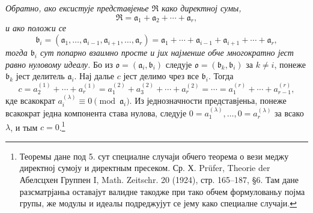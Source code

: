 \documentclass[11pt]{article}
\providecommand{\mR}{\mathfrak{R}}
\providecommand{\ma}{\mathfrak{a}}
\providecommand{\mb}{\mathfrak{b}}
\providecommand{\mo}{\mathfrak{o}}
\begin{document}
\emph{Обратно, ако ексистује представјенье $\mR$ како директној сумы,
\[
\mR=\ma_1+\ma_2+\cdots+\ma_r,
\]
и ако положи се
\[
\mb_i=(\ma_1,\ldots,\ma_{i-1},\ma_{i+1},\ldots,\ma_r)
=\ma_1+\cdots+\ma_{i-1}+\ma_{i+1}+\cdots+\ma_r,
\]
тогда $\mb_i$ сут попарно взаимно просте и јих најменше обче многократно јест равно нуловому идеалу.} Бо из $\mo=(\ma_i,\mb_i)$ следује $\mo=(\mb_k,\mb_i)$ за $k\ne i$, понеже $\mb_k$ јест делитель $\ma_i$. Нај далье $c$ јест делимо чрез все $\mb_i$. Тогда
\[
 c=a_2^{(1)}+\cdots+a_r^{(1)}
 =a_1^{(2)}+a_3^{(2)}+\cdots+a_r^{(2)}
 =\cdots=a_1^{(r)}+\cdots+a_{r-1}^{(r)},
\]
кде всакократ $a_i^{(\lambda)}\equiv0\pmod{\ma_i}$. Из једнозначности представјеньа, понеже всакократ једна компонента става нулова, следује $0=a_1^{(\lambda)},\ldots,0=a_r^{(\lambda)}$ за всако $\lambda$, и тым $c=0$.\footnote{Теоремы дане под 5. сут специалне случаји обчего теорема о вези меджу директној сумоју и директным пресеком. Ср. Х. Prüfer, Theorie der Абелсцхен Группен I, Math. Zeitschr. 20 (1924), стр. 165--187, §6. Там дане разсматрјаньа оставајут валидне такодже при тако обчем формулованьу појма групы, же модулы и идеалы подреджујут се јему како специалне случаји.}
\end{document}
